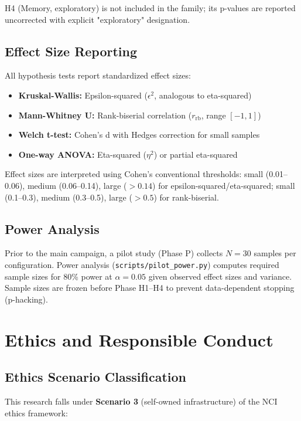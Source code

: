 H4 (Memory, exploratory) is not included in the family; its p-values are reported uncorrected with explicit "exploratory" designation.

\subsection{Effect Size Reporting}

All hypothesis tests report standardized effect sizes:

\begin{itemize}
    \item \textbf{Kruskal-Wallis:} Epsilon-squared ($\epsilon^2$, analogous to eta-squared)
    \item \textbf{Mann-Whitney U:} Rank-biserial correlation ($r_{\text{rb}}$, range $[-1, 1]$)
    \item \textbf{Welch t-test:} Cohen's d with Hedges correction for small samples
    \item \textbf{One-way ANOVA:} Eta-squared ($\eta^2$) or partial eta-squared
\end{itemize}

Effect sizes are interpreted using Cohen's conventional thresholds: small (0.01–0.06), medium (0.06–0.14), large ($> 0.14$) for epsilon-squared/eta-squared; small (0.1–0.3), medium (0.3–0.5), large ($> 0.5$) for rank-biserial.

\subsection{Power Analysis}

Prior to the main campaign, a pilot study (Phase P) collects $N = 30$ samples per configuration. Power analysis (\texttt{scripts/pilot\_power.py}) computes required sample sizes for 80\% power at $\alpha = 0.05$ given observed effect sizes and variance. Sample sizes are frozen before Phase H1–H4 to prevent data-dependent stopping (p-hacking).

\section{Ethics and Responsible Conduct}

\subsection{Ethics Scenario Classification}

This research falls under \textbf{Scenario 3} (self-owned infrastructure) of the NCI ethics framework:

